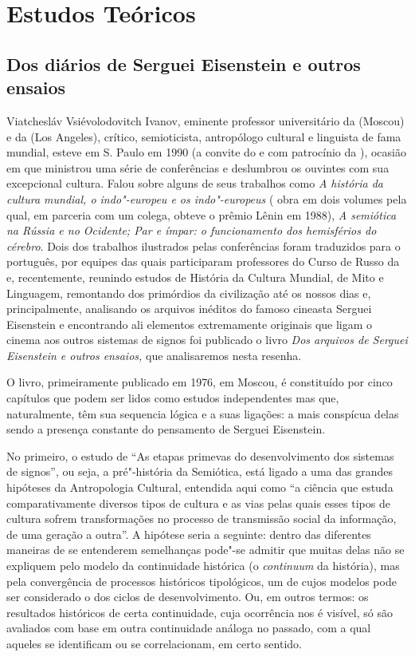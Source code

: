 \part{Estudos Teóricos}

\chapter{Dos diários de Serguei Eisenstein e outros ensaios}

Viatchesláv Vsiévolodovitch Ivanov, eminente professor universitário da
 (Moscou) e da  (Los Angeles), crítico, semioticista,
antropólogo cultural e linguista de fama mundial, esteve em S. Paulo em
1990 (a convite do  e com patrocínio da ), ocasião em que
ministrou uma série de conferências e deslumbrou os ouvintes com sua
excepcional cultura. Falou sobre alguns de seus trabalhos como \emph{A
história da cultura mundial, o indo"-europeu e os indo"-europeus} (
obra em dois volumes pela qual, em parceria com um colega, obteve o
prêmio Lênin em 1988), \emph{A semiótica na Rússia e no Ocidente; Par e
ímpar: o funcionamento dos hemisférios do cérebro}. Dois dos trabalhos
ilustrados pelas conferências foram traduzidos para o português, por
equipes das quais participaram professores do Curso de Russo da  e, recentemente, reunindo estudos de
História da Cultura Mundial, de Mito e Linguagem, remontando dos
primórdios da civilização até os nossos dias e, principalmente,
analisando os arquivos inéditos do famoso cineasta Serguei Eisenstein e
encontrando ali elementos extremamente originais que ligam o cinema aos
outros sistemas de signos foi publicado o livro \emph{Dos arquivos de
Serguei Eisenstein e outros ensaios,} que analisaremos nesta resenha.

O livro, primeiramente publicado em 1976, em Moscou, é constituído por
cinco capítulos que podem ser lidos como estudos independentes mas que,
naturalmente, têm sua sequencia lógica e a suas ligações: a mais
conspícua delas sendo a presença constante do pensamento de Serguei
Eisenstein.

No primeiro, o estudo de ``As etapas primevas do desenvolvimento
dos sistemas de signos'', ou seja, a pré"-história da Semiótica, está
ligado a uma das grandes hipóteses da Antropologia Cultural, entendida
aqui como ``a ciência que estuda comparativamente diversos tipos de
cultura e as vias pelas quais esses tipos de cultura sofrem
transformações no processo de transmissão social da informação, de uma
geração a outra''. A hipótese seria a seguinte: dentro
das diferentes maneiras de se entenderem semelhanças pode"-se admitir que
muitas delas não se expliquem pelo modelo da continuidade histórica (o
\emph{continuum} da história), mas pela convergência de processos
históricos tipológicos, um de cujos modelos pode ser considerado o dos
ciclos de desenvolvimento. Ou, em outros termos: os resultados
históricos de certa continuidade, cuja ocorrência nos é visível, só são
avaliados com base em outra continuidade análoga no passado, com a qual
aqueles se identificam ou se correlacionam, em certo sentido.

